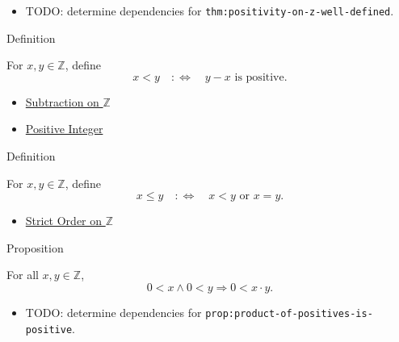 \begin{dependencies}
\begin{itemize}
  \item TODO: determine dependencies for \texttt{thm:positivity-on-z-well-defined}.
\end{itemize}
\end{dependencies}

\begin{definitionbox}{Definition}
\begin{definition}
\label{def:strict-order-on-z}
For $x,y\in\mathbb{Z}$, define
\[
x<y \quad:\Longleftrightarrow\quad y-x \text{ is positive}.
\]
\end{definition}
\end{definitionbox}

\begin{dependencies}
\begin{itemize}
  \item \hyperref[def:subtraction-on-z]{Subtraction on $\mathbb{Z}$}
  \item \hyperref[def:positive-integer]{Positive Integer}
\end{itemize}
\end{dependencies}

\begin{definitionbox}{Definition}
\begin{definition}
\label{def:order-on-z}
For $x,y\in\mathbb{Z}$, define
\[
x\le y \quad:\Longleftrightarrow\quad x<y \text{ or } x=y.
\]
\end{definition}
\end{definitionbox}

\begin{dependencies}
\begin{itemize}
  \item \hyperref[def:strict-order-on-z]{Strict Order on $\mathbb{Z}$}
\end{itemize}
\end{dependencies}

\begin{propositionbox}{Proposition}
\begin{proposition}
\label{prop:product-of-positives-is-positive}
For all $x,y\in\mathbb{Z}$,
\[
0<x\land 0<y \Longrightarrow 0<x\cdot y.
\]
\end{proposition}
\end{propositionbox}

\begin{dependencies}
\begin{itemize}
  \item TODO: determine dependencies for \texttt{prop:product-of-positives-is-positive}.
\end{itemize}
\end{dependencies}

